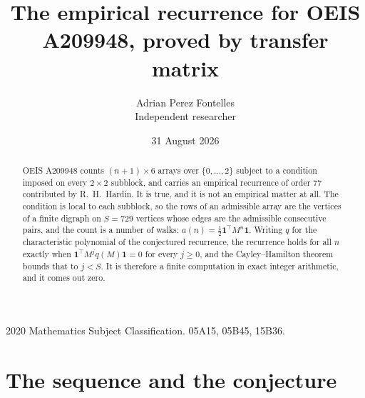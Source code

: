 \documentclass[11pt,a4paper]{article}
\title{The empirical recurrence for OEIS A209948, proved by transfer matrix}
\author{Adrian Perez Fontelles\\ \small Independent researcher}
\date{31 August 2026}
\theoremstyle{plain}
\theoremstyle{definition}
\begin{document}
\maketitle

\begin{abstract}
OEIS A209948 counts $(n+1)\times6$ arrays over $\{0,\dots,2\}$ subject to a condition imposed on
every $2\times2$ subblock, and carries an empirical recurrence of order $77$ contributed
by R.~H.~Hardin. It is true, and it is not an empirical matter at all. The condition is local
to each subblock, so the rows of an admissible array are the vertices of a finite digraph
on $S=729$ vertices whose edges are the admissible consecutive pairs, and the count is a
number of walks: $a(n)=\tfrac1{2}\mathbf{1}^{\!\top}M^{n}\mathbf{1}$. Writing $q$
for the characteristic polynomial of the conjectured recurrence, the recurrence holds for all
$n$ exactly when $\mathbf{1}^{\!\top}M^{j}q(M)\mathbf{1}=0$ for every $j\ge0$, and the
Cayley--Hamilton theorem bounds that to $j<S$. It is therefore a finite computation in exact
integer arithmetic, and it comes out zero.
\end{abstract}

\noindent\small 2020 Mathematics Subject Classification. 05A15, 05B45, 15B36.\normalsize

\section{The sequence and the conjecture}
\end{document}
